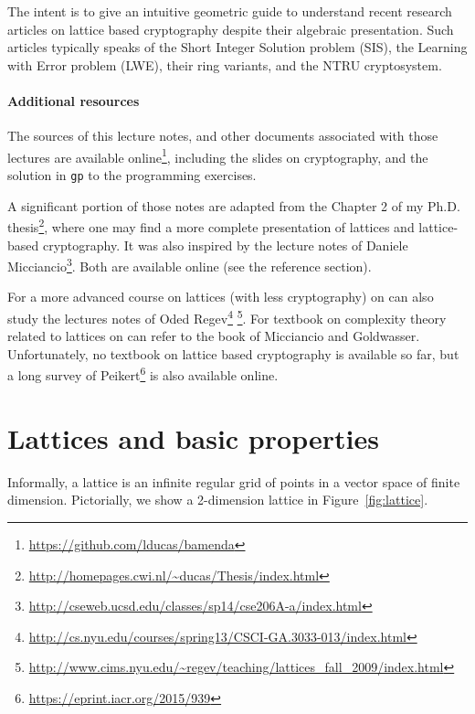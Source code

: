 \documentclass[12pt]{article}
\begin{document}
The intent is to give an intuitive geometric guide to understand recent research articles on lattice based cryptography despite their algebraic presentation. Such articles typically speaks of the Short Integer Solution problem (SIS), the Learning with Error problem (LWE), their ring variants, and the NTRU cryptosystem. 

\paragraph{Additional resources}

The sources of this lecture notes, and other documents associated with those lectures are available online\footnote{\url{https://github.com/lducas/bamenda}}, including the slides on cryptography, and the solution in \texttt{gp} to the programming exercises.

A significant portion of those notes are adapted from the Chapter 2 of my Ph.D. thesis\footnote{\url{http://homepages.cwi.nl/~ducas/Thesis/index.html}}, where one may find a more complete presentation of lattices and lattice-based cryptography. It was also inspired by the lecture notes of Daniele Micciancio\footnote{\url{http://cseweb.ucsd.edu/classes/sp14/cse206A-a/index.html}}. Both are available online (see the reference section). 

For a more advanced course on lattices (with less cryptography) on can also study the lectures notes of Oded Regev\footnote{\url{http://cs.nyu.edu/courses/spring13/CSCI-GA.3033-013/index.html}} \footnote{\url{http://www.cims.nyu.edu/~regev/teaching/lattices_fall_2009/index.html}}. For textbook on complexity theory related to lattices on can refer to the book of  Micciancio and Goldwasser. Unfortunately, no textbook on lattice based cryptography is available so far, but a long survey of Peikert\footnote{\url{https://eprint.iacr.org/2015/939}} is also available online.


\section{Lattices and basic properties}

Informally, a lattice is an infinite regular grid of points in a vector space of finite dimension. Pictorially, we show a 2-dimension lattice in Figure~\ref{fig:lattice}.
\end{document}
